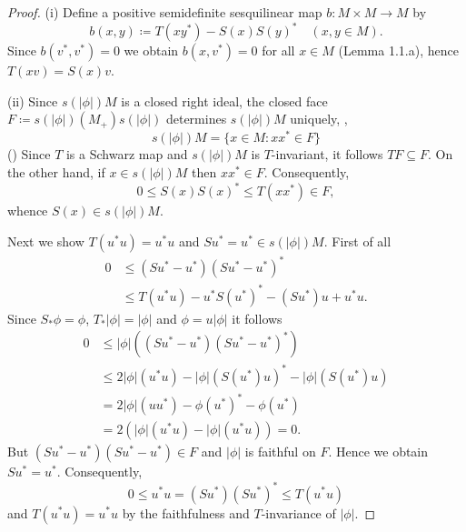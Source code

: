 \begin{proof}
(i) Define a positive semidefinite sesquilinear map $b: M\times M \to M$ by
\[
b(x,y) \coloneqq T(xy^{*}) - S(x)S(y)^{*} \quad (x, y\in M).
\]
Since $b(v^{*},v^{*}) = 0$ we obtain $b(x,v^{*}) = 0$ for all $x \in M$ (Lemma 1.1.a), hence $T(xv) = S(x)v$.

(ii)
Since $s(|\phi|)M$ is a closed right ideal, the closed face $F \coloneqq s(|\phi|)(M_{+})s(|\phi|)$ determines $s(|\phi|)M$ uniquely, \ie,
\[
s(|\phi|)M = \{x \in M \colon xx^{*} \in F\}
\]
(\citet[Theorem 1.5.2]{pedersen:1979}) %
Since $T$ is a Schwarz map and $s(|\phi|)M$ is $T$-invariant, it follows $TF \subseteq F$.
On the other hand, if $x \in s(|\phi|)M$ then $xx^{*} \in F$.
Consequently,
\[
0 \leq S(x)S(x)^{*} \leq T(xx^{*}) \in F,
\]
whence $S(x) \in s(|\phi|)M$.

Next we show $T(u^{*}u) = u^{*}u$ and $Su^{*} = u^{*} \in s(|\phi|)M$.
First of all
\begin{align*}
	0 &\leq (Su^{*} - u^{*})(Su^{*} - u^{*})^{*} \\
	& \leq T(u^{*}u) - u^{*}S(u^{*})^{*} - (Su^{*})u + u^{*}u.
\end{align*}
Since $ S_{*}\phi = \phi $, $ T_{*}|\phi| = |\phi| $ and $ \phi = u|\phi| $ it follows
\begin{align*}
	0 &\leq |\phi|((Su^{*} - u^{*})(Su^{*} - u^{*})^{*}) \\
	& \leq 2|\phi|(u^{*}u) - |\phi|(S(u^{*})u)^{*} - |\phi|(S(u^{*})u) \\
	& = 2|\phi|(uu^{*}) - \phi(u^{*})^{*} - \phi(u^{*}) \\
	& = 2(|\phi|(u^{*}u) - |\phi|(u^{*}u)) = 0.
\end{align*}
But $(Su^{*} - u^{*})(Su^{*} - u^{*}) \in F$ and $|\phi|$ is faithful on $F$.
Hence we obtain $Su^{*} = u^{*}$.
Consequently,
\[
	0 \leq u^{*}u = (Su^{*})(Su^{*})^{*} \leq T(u^{*}u)
\]
and $T(u^{*}u) = u^{*}u$ by the faithfulness and $T$-invariance of $|\phi|$.
\end{proof}
